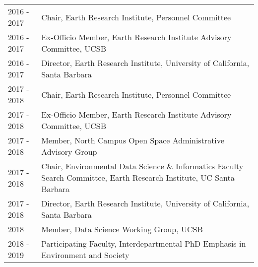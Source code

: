 
\begin{supertabular}{lp{15cm}} 
2016 - 2017 & Chair, Earth Research Institute, Personnel Committee \\
2016 - 2017 & Ex-Officio Member, Earth Research Institute Advisory Committee, UCSB \\
2016 - 2017  & Director, Earth Research Institute, University of California, Santa Barbara \\
2017 - 2018 & Chair, Earth Research Institute, Personnel Committee \\
2017 - 2018 & Ex-Officio Member, Earth Research Institute Advisory Committee, UCSB \\
2017 - 2018 & Member, North Campus Open Space Administrative Advisory Group \\
2017 - 2018 & Chair, Environmental Data Science \& Informatics Faculty Search Committee, Earth Research Institute, UC Santa Barbara \\
2017 - 2018  & Director, Earth Research Institute, University of California, Santa Barbara \\
2018 & Member, Data Science Working Group, UCSB \\
2018 - 2019 & Participating Faculty, Interdepartmental PhD Emphasis in Environment and Society \\
\end{supertabular}

